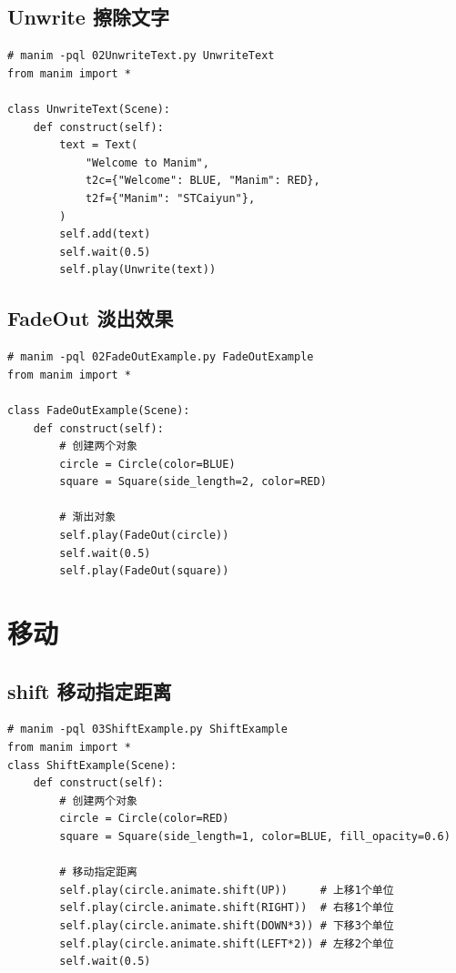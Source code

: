 \subsection{Unwrite 擦除文字}
\label{subsubsec:manim_animation_destroy_unwrite}
\begin{lstlisting}[style=pythonstyle]
# manim -pql 02UnwriteText.py UnwriteText
from manim import *

class UnwriteText(Scene):
    def construct(self):
        text = Text(
            "Welcome to Manim",
            t2c={"Welcome": BLUE, "Manim": RED},
            t2f={"Manim": "STCaiyun"},
        )
        self.add(text)
        self.wait(0.5)
        self.play(Unwrite(text))
\end{lstlisting}

\subsection{FadeOut 淡出效果}
\label{subsubsec:manim_animation_destroy_fadeout}
\begin{lstlisting}[style=pythonstyle]
# manim -pql 02FadeOutExample.py FadeOutExample
from manim import *

class FadeOutExample(Scene):
    def construct(self):
        # 创建两个对象
        circle = Circle(color=BLUE)
        square = Square(side_length=2, color=RED)

        # 渐出对象
        self.play(FadeOut(circle))
        self.wait(0.5)
        self.play(FadeOut(square))
\end{lstlisting}

\section{移动}
\label{sec:manim_animation_move}
\subsection{shift 移动指定距离}
\label{subsubsec:manim_animation_move_shift}
\begin{lstlisting}[style=pythonstyle]
# manim -pql 03ShiftExample.py ShiftExample
from manim import *
class ShiftExample(Scene):
    def construct(self):
        # 创建两个对象
        circle = Circle(color=RED)
        square = Square(side_length=1, color=BLUE, fill_opacity=0.6)

        # 移动指定距离
        self.play(circle.animate.shift(UP))     # 上移1个单位
        self.play(circle.animate.shift(RIGHT))  # 右移1个单位
        self.play(circle.animate.shift(DOWN*3)) # 下移3个单位
        self.play(circle.animate.shift(LEFT*2)) # 左移2个单位
        self.wait(0.5)
\end{lstlisting}


